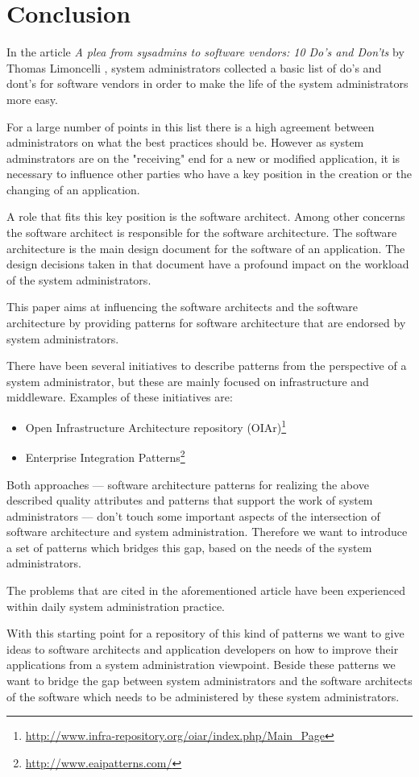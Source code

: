 \section{Conclusion} 

In the article \textit{A plea from sysadmins to software vendors: 10 Do's and Don'ts} by Thomas Limoncelli \cite{Limoncelli2011a}, system administrators collected a basic list of do's and dont's for software vendors in order to make the life of the system administrators more easy. 

For a large number of points in this list there is a high agreement between administrators on what the best practices should be. However as system adminstrators are on the "receiving" end for a new or modified application, it is necessary to influence other parties who have a key position in the creation or the changing of an application. 

A role that fits this key position is the software architect. Among other concerns the software architect is responsible for the software architecture. The software architecture is the main design document for the software of an application. The design decisions taken in that document have a profound impact on the workload of the system administrators. 

This paper aims at influencing the software architects and the software architecture by providing patterns for software architecture that are endorsed by system administrators.

There have been several initiatives to describe patterns from the perspective of a system administrator, but these are mainly focused on infrastructure and middleware. Examples of these initiatives are: 
\begin{itemize}
	\item Open Infrastructure Architecture repository (OIAr)\footnote{\url{http://www.infra-repository.org/oiar/index.php/Main_Page}} 
	\item Enterprise Integration Patterns\footnote{\url{http://www.eaipatterns.com/}}
\end{itemize}

Both approaches --- software architecture patterns for realizing the above described quality attributes and patterns that support the work of system administrators --- don't touch some important aspects of the intersection of software architecture and system administration. Therefore we want to introduce a set of patterns which bridges this gap, based on the needs of the system administrators. 

The problems that are cited in the aforementioned article have been experienced within daily system administration practice. 

With this starting point for a repository of this kind of patterns we want to give ideas to software architects and application developers on how to improve their applications from a system administration viewpoint. Beside these patterns we want to bridge the gap between system administrators and the software architects of the software which needs to be administered by these system administrators.

